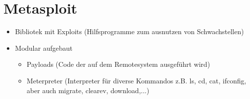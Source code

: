 \section{Metasploit}\label{sec:metasploit}
\begin{itemize}
    \item Bibliotek mit Exploits (Hilfsprogramme zum ausnutzen von Schwachstellen)
    \item Modular aufgebaut
        \begin{itemize}
            \item Payloads (Code der auf dem Remotesystem ausgeführt wird)
            \item Meterpreter (Interpreter für diverse Kommandos z.B. ls, cd, cat, ifconfig, aber auch migrate, clearev, download,...)
        \end{itemize}
\end{itemize}